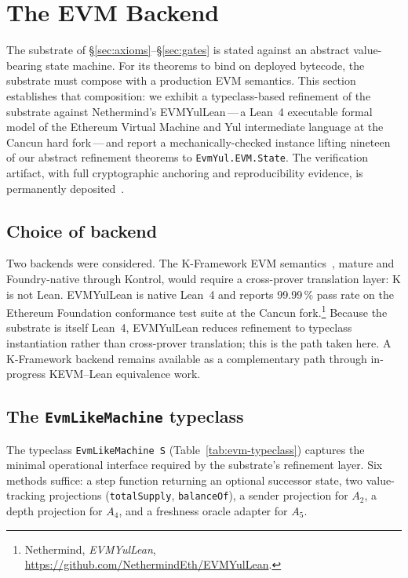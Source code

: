 \documentclass[11pt,a4paper]{article}
\begin{document}
\section{The EVM Backend}\label{sec:evm-backend}

The substrate of \S\ref{sec:axioms}--\S\ref{sec:gates} is stated against an abstract value-bearing state machine. For its theorems to bind on deployed bytecode, the substrate must compose with a production EVM semantics. This section establishes that composition: we exhibit a typeclass-based refinement of the substrate against Nethermind's EVMYulLean\,---\,a Lean~4 executable formal model of the Ethereum Virtual Machine and Yul intermediate language at the Cancun hard fork\,---\,and report a mechanically-checked instance lifting nineteen of our abstract refinement theorems to \texttt{EvmYul.EVM.State}. The verification artifact, with full cryptographic anchoring and reproducibility evidence, is permanently deposited~\cite{duncan2026parallax5verification}.

\subsection{Choice of backend}

Two backends were considered. The K-Framework EVM semantics~\cite{kevm}, mature and Foundry-native through Kontrol, would require a cross-prover translation layer: K is not Lean. EVMYulLean is native Lean~4 and reports 99.99\,\% pass rate on the Ethereum Foundation conformance test suite at the Cancun fork.\footnote{Nethermind, \textit{EVMYulLean}, \url{https://github.com/NethermindEth/EVMYulLean}.} Because the substrate is itself Lean~4, EVMYulLean reduces refinement to typeclass instantiation rather than cross-prover translation; this is the path taken here. A K-Framework backend remains available as a complementary path through in-progress KEVM--Lean equivalence work.

\subsection{The \texttt{EvmLikeMachine} typeclass}

The typeclass \texttt{EvmLikeMachine S} (Table~\ref{tab:evm-typeclass}) captures the minimal operational interface required by the substrate's refinement layer. Six methods suffice: a step function returning an optional successor state, two value-tracking projections (\texttt{totalSupply}, \texttt{balanceOf}), a sender projection for $A_2$, a depth projection for $A_4$, and a freshness oracle adapter for $A_5$.
\end{document}
